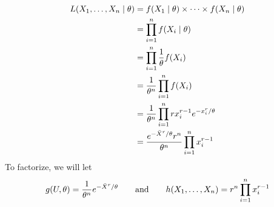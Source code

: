 \begin{align*}
    L({X}_1, \dots, {X}_n \mid \theta) &= f(X_1 \mid \theta) \times \cdots \times f(X_n \mid \theta)\\
    &= \prod_{i=1}^{n} f(X_i \mid \theta)\\
    &= \prod_{i=1}^{n} \frac{1}{{\theta}} f(X_i)\\
    &= \frac{1}{{\theta^n}}\prod_{i=1}^{n} f(X_i)\\
    &= \frac{1}{{\theta^n}}\prod_{i=1}^{n} rx_i^{r-1}e^{-x_i^r/\theta}\\
    &= \frac{e^{-\bar{X}^r / \theta}r^n}{\theta^n}\prod_{i=1}^{n} x^{r-1}_i
\end{align*}
To factorize, we will let
$$g(U, \theta) = \frac{1}{{\theta^n}} e^{-\bar{X}^r/\theta} \qquad \text{and} \qquad h({X}_1, \dots, {X}_n)  = r^n \prod_{i=1}^n x^{r-1}_i$$